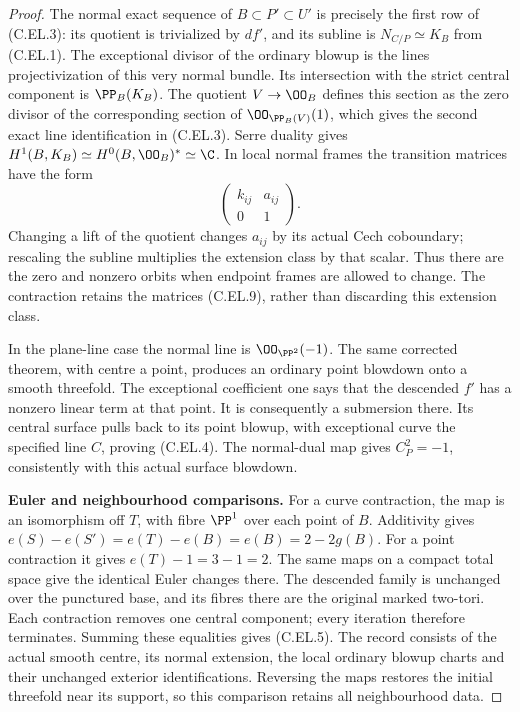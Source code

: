 \begin{proof}
The normal exact sequence of $B\subset P'\subset U'$ is
precisely the first row of (C.EL.3): its quotient is trivialized
by $df'$, and its subline is $N_{C/P}\simeq K_B$ from
(C.EL.1). The exceptional divisor of the ordinary blowup is
the lines projectivization of this very normal bundle. Its
intersection with the strict central component is
$\PP_B(K_B)$. The quotient $V\to\OO_B$ defines this section
as the zero divisor of the corresponding section of
$\OO_{\PP_B(V)}(1)$, which gives the second exact line
identification in (C.EL.3). Serre duality gives
$H^1(B,K_B)\simeq H^0(B,\OO_B)^*\simeq\C$.
In local normal frames the transition matrices have the form
\[
        \begin{pmatrix}k_{ij}&a_{ij}\\0&1\end{pmatrix}.
                                                        \tag{C.EL.9}
\]
Changing a lift of the quotient changes $a_{ij}$ by its
actual Cech coboundary; rescaling the subline multiplies the
extension class by that scalar. Thus there are the zero and
nonzero orbits when endpoint frames are allowed to change.
The contraction retains the matrices (C.EL.9), rather than
discarding this extension class.

In the plane-line case the normal line is $\OO_{\PP^2}(-1)$.
The same corrected theorem, with centre a point, produces an
ordinary point blowdown onto a smooth threefold. The exceptional
coefficient one says that the descended $f'$ has a nonzero
linear term at that point. It is consequently a submersion
there. Its central surface pulls back to its point blowup,
with exceptional curve the specified line $C$, proving
(C.EL.4). The normal-dual map gives $C^2_P=-1$, consistently
with this actual surface blowdown.

\par\medskip\noindent\textbf{Euler and neighbourhood comparisons.}
For a curve contraction, the map is an isomorphism off $T$,
with fibre $\PP^1$ over each point of $B$. Additivity gives
$e(S)-e(S')=e(T)-e(B)=e(B)=2-2g(B)$.
For a point contraction it gives $e(T)-1=3-1=2$.
The same maps on a compact total space give the identical
Euler changes there. The descended family is unchanged over
the punctured base, and its fibres there are the original
marked two-tori. Each contraction removes one central
component; every iteration therefore terminates. Summing
these equalities gives (C.EL.5). The record consists of the
actual smooth centre, its normal extension, the local ordinary
blowup charts and their unchanged exterior identifications.
Reversing the maps restores the initial threefold near its
support, so this comparison retains all neighbourhood data.


\end{proof}
